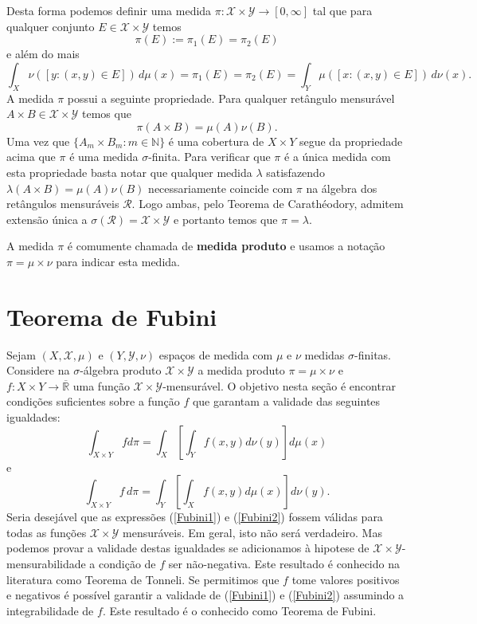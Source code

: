Desta forma podemos definir uma medida 
$\pi:\mathscr{X}\times\mathscr{Y}\to [0,\infty]$ 
tal que para qualquer conjunto $E\in \mathscr{X}\times\mathscr{Y}$ 
temos 
\[
\pi(E) := \pi_1(E) = \pi_2(E)
\] 
e além do mais 
\[
	\int_{X} \nu([y:(x,y)\in E ])\, d\mu(x)
	=
	\pi_1(E)
	=
	\pi_2(E)
	=
	\int_{Y} \mu([x:(x,y)\in E ])\, d\nu(x).
\]
A medida $\pi$ possui a seguinte propriedade.
Para qualquer retângulo mensurável 
$A\times B\in \mathscr{X}\times\mathscr{Y}$ temos que 
\[
\pi(A\times B)=\mu(A)\nu(B).
\]
Uma vez que $\{A_m\times B_m: m\in \mathbb{N}\}$ é uma cobertura 
de $X\times Y$ segue da propriedade acima que 
$\pi$ é uma medida $\sigma$-finita. 
Para verificar que $\pi$ é a única medida com esta propriedade
basta notar que qualquer medida $\lambda$ satisfazendo 
$\lambda(A\times B)=\mu(A)\nu(B)$ necessariamente
coincide com $\pi$ na álgebra dos retângulos mensuráveis 
$\mathscr{R}$. Logo ambas, pelo Teorema de Carathéodory,
admitem extensão única a 
$\sigma(\mathscr{R})=\mathscr{X}\times\mathscr{Y}$ 
e portanto temos que $\pi=\lambda$.  

A medida $\pi$ é comumente chamada de \textbf{medida produto} e 
usamos a notação $\pi = \mu\times\nu$ para indicar esta medida.







\section{Teorema de Fubini}  
Sejam $(X, \mathscr{X}, \mu)$ e $(Y, \mathscr{Y}, \nu)$
espaços de medida com $\mu$ e $\nu$ medidas $\sigma$-finitas. 
Considere  na $\sigma$-álgebra
produto $\mathscr{X}\times \mathscr{Y}$ 
a medida produto $\pi = \mu\times \nu$ e 
$f:X\times Y\to \overline{\mathbb{R}}$ 
uma função $\mathscr{X}\times \mathscr{Y}$-mensurável. 
O objetivo nesta seção é encontrar condições suficientes  
sobre a função $f$ que garantam a validade
das seguintes igualdades:
\begin{equation}\label{Fubini1}
\int_{X\times Y}f d\pi
= 
\int_X\left[ \int_Y f(x,y) d\nu(y)\right] d\mu(x)
\end{equation}
e
\begin{equation}\label{Fubini2}
\int_{X\times Y}f\, d\pi
=
\int_Y\left[\int_Xf(x,y) d\mu(x)\right] d\nu(y).
\end{equation}
Seria desejável que as expressões (\ref{Fubini1}) e (\ref{Fubini2}) 
fossem válidas para todas as funções $\mathscr{X}\times\mathscr{Y}$
mensuráveis. Em geral, isto não será verdadeiro. Mas 
podemos provar a validade destas igualdades se adicionamos
à hipotese de $\mathscr{X}\times \mathscr{Y}$-mensurabilidade a 
condição de $f$ ser não-negativa. 
Este resultado é conhecido na literatura como Teorema de Tonneli. 
Se permitimos que $f$ tome valores positivos e negativos é possível  
garantir a validade de (\ref{Fubini1}) e (\ref{Fubini2}) 
assumindo a integrabilidade de $f$. Este resultado é o conhecido 
como Teorema de Fubini.




